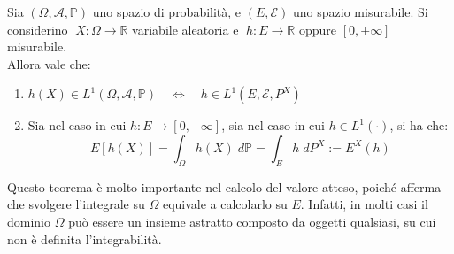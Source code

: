 \begin{definizione}
\label{def:regE}
    Sia $(\Omega, \mathcal{A}, \mathbb{P})$ uno spazio di probabilità, e $(E, \mathcal{E})$ uno spazio misurabile. Si considerino $\;X:\Omega\to\mathbb{R}$ variabile aleatoria e $\;h:E\to\mathbb{R}$ oppure $[0, +\infty]$ misurabile.\\
    Allora vale che:
    \begin{enumerate}
        \item $h(X) \in L^1 (\Omega, \mathcal{A}, \mathbb{P})\quad \iff \quad h \in L^1(E, \mathcal{E}, P^X)$
        \item Sia nel caso in cui $h:E\to[0, +\infty]$, sia nel caso in cui $h\in L^1(\cdot)$, si ha che:
        \[E\left[h(X)\right]= \boxed{\int_\Omega h(X) \;d\mathbb{P} = \int_E h\;dP^X} := E^X(h)\] 
    \end{enumerate}
\end{definizione}

Questo teorema è molto importante nel calcolo del valore atteso, poiché afferma
che svolgere l’integrale su $\Omega$ equivale a calcolarlo su $E$. Infatti, in molti casi il dominio $\Omega$ può essere un insieme astratto composto da oggetti qualsiasi,
su cui non è definita l’integrabilità.

